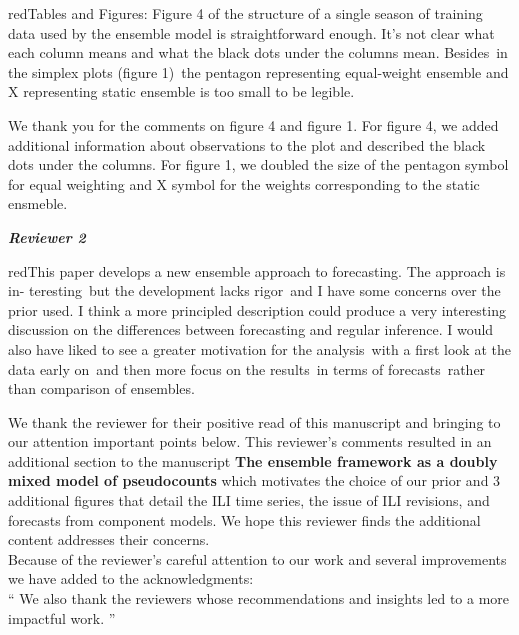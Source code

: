 \documentclass[
  fontsize=11pt,
  paper=a4,
  parskip=half,
  enlargefirstpage=on,    %
  fromalign=right,        %
  fromphone=on,           %
  fromrule=aftername,     %
  addrfield=on,           %
  backaddress=on,         %
  subject=beforeopening,  %
  locfield=narrow,        %
  foldmarks=on,           %
]{scrlttr2}
\newcommand{\rv}[1]{\textit{\textbf{Reviewer #1}}}
\begin{document}
    \begin{commt}{red}{Tables and Figures: Figure 4 of the structure of a single season of training data used by the ensemble model is straightforward enough. It’s not clear what each column means and what the black dots under the columns mean. Besides\, in the simplex plots (figure 1)\, the pentagon representing equal-weight ensemble and X representing static ensemble is too small to be legible. }

      We thank you for the comments on figure 4 and figure 1.
      For figure 4, we added additional information about observations to the plot and described the black dots under the columns.
      For figure 1, we doubled the size of the pentagon symbol for equal weighting and X symbol for the weights corresponding to the static ensmeble.
    \end{commt}

    \clearpage
    \rv{2}
    \begin{commt}{red}{This paper develops a new ensemble approach to forecasting. The approach is in- teresting\, but the development lacks rigor\, and I have some concerns over the prior used. I think a more principled description could produce a very interesting discussion on the differences between forecasting and regular inference.
I would also have liked to see a greater motivation for the analysis\, with a first look at the data early on\, and then more focus on the results\, in terms of forecasts\, rather than comparison of ensembles.}

   We thank the reviewer for their positive read of this manuscript and bringing to our attention important points below.
   This reviewer's comments resulted in an additional section to the manuscript \textbf{The ensemble framework as a doubly mixed model of pseudocounts} which motivates the choice of our prior and 3 additional figures that detail the ILI time series, the issue of ILI revisions, and forecasts from component models.
   We hope this reviewer finds the additional content addresses their concerns.\\

   Because of the reviewer's careful attention to our work and several improvements we have added to the acknowledgments:\\

      ``
      We also thank the reviewers whose recommendations and insights led to a more impactful work.
      ''
    \end{commt}
\end{document}
